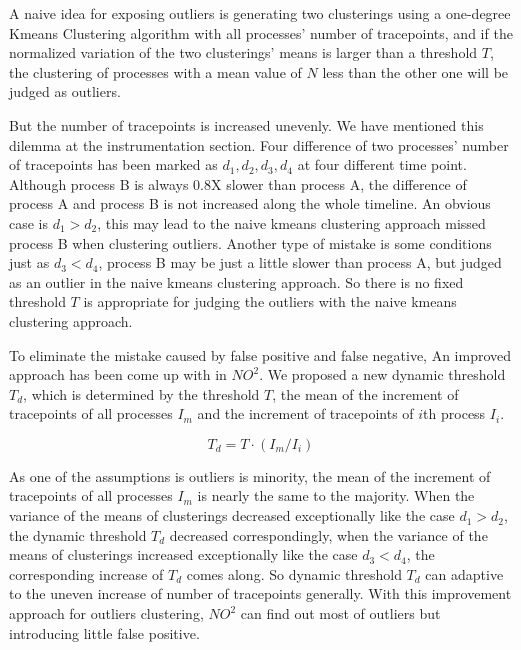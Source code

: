 A naive idea for exposing outliers is generating two clusterings using a one-degree Kmeans Clustering algorithm with all processes' number of tracepoints, and if the normalized variation of the two clusterings' means is larger than a threshold $T$, the clustering of processes with a mean value of $N$ less than the other one will be judged as outliers.

But the number of tracepoints is increased unevenly. We have mentioned this dilemma at the instrumentation section. Four difference of two processes' number of tracepoints has been marked as $d_1, d_2, d_3, d_4$ at four different time point. Although process B is always 0.8X slower than process A, the difference of process A and process B is not increased along the whole timeline. An obvious case is $d_1 > d_2$, this may lead to the naive kmeans clustering approach missed process B when clustering outliers. Another type of mistake is some conditions just as $d_3 < d_4$, process B may be just a little slower than process A, but judged as an outlier in the naive kmeans clustering approach. So there is no fixed threshold $T$ is appropriate for judging the outliers with the naive kmeans clustering approach.

To eliminate the mistake caused by false positive and false negative, An improved approach has been come up with in $NO^2$. We proposed a new dynamic threshold $T_d$, which is determined by the threshold $T$, the mean of the increment of tracepoints of all processes $I_m$ and the increment of tracepoints of $i$th process $I_i$.

$$T_d = T \cdot (I_m / I_i)$$

As one of the assumptions is outliers is minority, the mean of the increment of tracepoints of all processes $I_m$ is nearly the same to the majority. When the variance of the means of clusterings decreased exceptionally like the case $d_1 > d_2$, the dynamic threshold $T_d$ decreased correspondingly, when the variance of the means of clusterings increased exceptionally like the case $d_3 < d_4$, the corresponding increase of $T_d$ comes along. So dynamic threshold $T_d$ can adaptive to the uneven increase of number of tracepoints generally. With this improvement approach for outliers clustering, $NO^2$ can find out most of outliers but introducing little false positive.